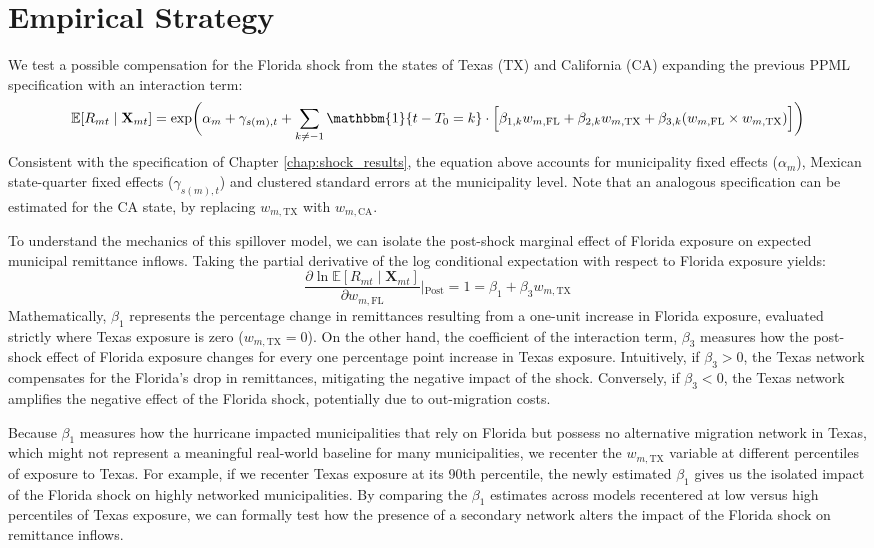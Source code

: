 \section{Empirical Strategy}
We test a possible compensation for the Florida shock from the states of Texas (TX) and California (CA) expanding the previous PPML specification with an interaction term:
{ \small
\begin{equation}
\mathbb{E}[R_{mt} \mid \mathbf{X}_{mt}] = \exp \biggl( \alpha_m + \gamma_{s(m),t} + \sum_{k \neq -1} \mathbbm{1}\{t - T_0 = k\} \cdot \Bigl[ \beta_{1,k} w_{m,\text{FL}} + \beta_{2,k} w_{m,\text{TX}} + \beta_{3,k} (w_{m,\text{FL}} \times w_{m,\text{TX}}) \Bigr] \biggr) \nonumber
\end{equation}
}
Consistent with the specification of Chapter \ref{chap:shock_results}, the equation above accounts for municipality fixed effects ($\alpha_m$), Mexican state-quarter fixed effects ($\gamma_{s(m),t}$) and clustered standard errors at the municipality level. Note that an analogous specification can be estimated for the CA state, by replacing $w_{m,\text{TX}}$ with $w_{m,\text{CA}}$.

To understand the mechanics of this spillover model, we can isolate the post-shock marginal effect of Florida exposure on expected municipal remittance inflows. Taking the partial derivative of the log conditional expectation with respect to Florida exposure yields:
\begin{equation} \label{eq:marginal-effect}
\frac{\partial \ln \mathbb{E}[R_{mt} \mid \mathbf{X}_{mt}]}{\partial w_{m,\text{FL}}} \Big|{_\text{Post}=1} = \beta_1 + \beta_3 w_{m,\text{TX}}
\end{equation}
Mathematically, $\beta_1$ represents the percentage change in remittances resulting from a one-unit increase in Florida exposure, evaluated strictly where Texas exposure is zero ($w_{m,\text{TX}} = 0$). On the other hand, the coefficient of the interaction term, $\beta_3$ measures how the post-shock effect of Florida exposure changes for every one percentage point increase in Texas exposure. Intuitively, if $\beta_3 > 0$, the Texas network compensates for the Florida's drop in remittances, mitigating the negative impact of the shock. Conversely, if $\beta_3 < 0$, the Texas network amplifies the negative effect of the Florida shock, potentially due to out-migration costs.

Because $\beta_1$ measures how the hurricane impacted municipalities that rely on Florida but possess no alternative migration network in Texas, which might not represent a meaningful real-world baseline for many municipalities, we recenter the $w_{m,\text{TX}}$ variable at different percentiles of exposure to Texas. For example, if we recenter Texas exposure at its 90th percentile, the newly estimated $\beta_1$ gives us the isolated impact of the Florida shock on highly networked municipalities. By comparing the $\beta_1$ estimates across models recentered at low versus high percentiles of Texas exposure, we can formally test how the presence of a secondary network alters the impact of the Florida shock on remittance inflows.

